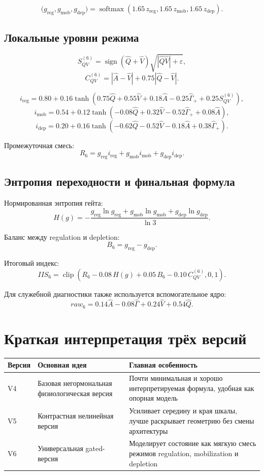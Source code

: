 \documentclass[12pt,a4paper]{article}
\begin{document}
\[
\bigl(g_{\mathrm{reg}},g_{\mathrm{mob}},g_{\mathrm{dep}}\bigr)=
\operatorname{softmax}\!\left(
1.65\,z_{\mathrm{reg}},
1.65\,z_{\mathrm{mob}},
1.65\,z_{\mathrm{dep}}
\right).
\]

\subsection{Локальные уровни режима}
\[
S_{QV}^{(6)}=\operatorname{sign}(\widehat{Q}+\widehat{V})\sqrt{|\widehat{Q}\widehat{V}|+\varepsilon},
\]
\[
C_{QV}^{(6)}=|\widehat{A}-\widehat{V}|+0.75|\widehat{Q}-\widehat{V}|.
\]

\[
i_{\mathrm{reg}}=
0.80+0.16\tanh\!\left(
0.75\widehat{Q}+0.55\widehat{V}+0.18\widehat{A}-0.25\widehat{\Gamma}_++0.25S_{QV}^{(6)}
\right),
\]
\[
i_{\mathrm{mob}}=
0.54+0.12\tanh\!\left(
-0.08\widehat{Q}+0.32\widehat{V}-0.52\widehat{\Gamma}_++0.08\widehat{A}
\right),
\]
\[
i_{\mathrm{dep}}=
0.20+0.16\tanh\!\left(
-0.62\widehat{Q}-0.52\widehat{V}-0.18\widehat{A}+0.38\widehat{\Gamma}_+
\right).
\]

Промежуточная смесь:
\[
R_6=
g_{\mathrm{reg}}i_{\mathrm{reg}}
+g_{\mathrm{mob}}i_{\mathrm{mob}}
+g_{\mathrm{dep}}i_{\mathrm{dep}}.
\]

\subsection{Энтропия переходности и финальная формула}
Нормированная энтропия гейта:
\[
H(g)=
-\frac{g_{\mathrm{reg}}\ln g_{\mathrm{reg}}
+g_{\mathrm{mob}}\ln g_{\mathrm{mob}}
+g_{\mathrm{dep}}\ln g_{\mathrm{dep}}}{\ln 3}.
\]

Баланс между regulation и depletion:
\[
B_6=g_{\mathrm{reg}}-g_{\mathrm{dep}}.
\]

Итоговый индекс:
\[
IIS_6=
\operatorname{clip}\!\left(
R_6
-0.08\,H(g)
+0.05\,B_6
-0.10\,C_{QV}^{(6)},
0,1
\right).
\]

Для служебной диагностики также используется вспомогательное ядро:
\[
raw_6=0.14\widehat{A}-0.08\widehat{\Gamma}+0.24\widehat{V}+0.54\widehat{Q}.
\]

\section{Краткая интерпретация трёх версий}
\begin{center}
\begin{tabular}{>{\raggedright\arraybackslash}p{2.6cm} >{\raggedright\arraybackslash}p{4.2cm} >{\raggedright\arraybackslash}p{7.2cm}}
\toprule
Версия & Основная идея & Главная особенность \\
\midrule
V4 & Базовая негормональная физиологическая версия & Почти минимальная и хорошо интерпретируемая формула, удобная как опорная модель \\
V5 & Контрастная нелинейная версия & Усиливает середину и края шкалы, лучше раскрывает геометрию без смены архитектуры \\
V6 & Универсальная gated-версия & Моделирует состояние как мягкую смесь режимов regulation, mobilization и depletion \\
\bottomrule
\end{tabular}
\end{center}
\end{document}
